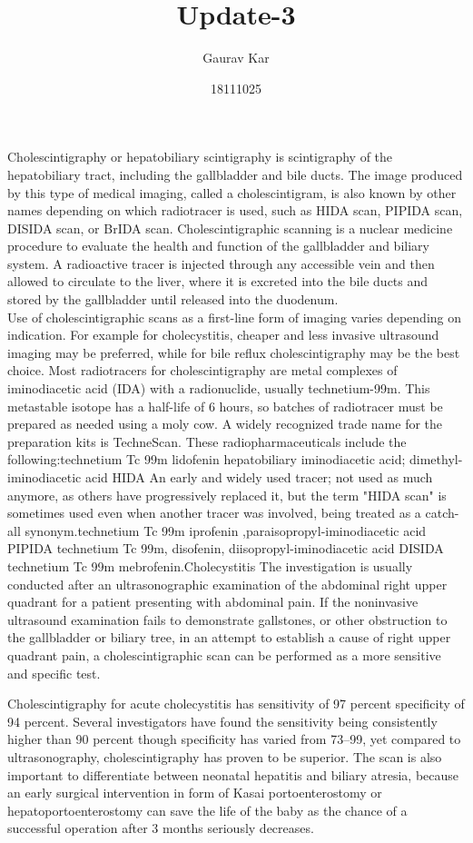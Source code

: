 \documentclass{article}
\title{Update-3}
\author{Gaurav Kar}
\date{18111025}
\begin{document}
 

\maketitle


Cholescintigraphy or hepatobiliary scintigraphy is scintigraphy of the hepatobiliary tract, including the gallbladder and bile ducts. The image produced by this type of medical imaging, called a cholescintigram, is also known by other names depending on which radiotracer is used, such as HIDA scan, PIPIDA scan, DISIDA scan, or BrIDA scan. Cholescintigraphic scanning is a nuclear medicine procedure to evaluate the health and function of the gallbladder and biliary system. A radioactive tracer is injected through any accessible vein and then allowed to circulate to the liver, where it is excreted into the bile ducts and stored by the gallbladder until released into the duodenum.\\Use of cholescintigraphic scans as a first-line form of imaging varies depending on indication. For example for cholecystitis, cheaper and less invasive ultrasound imaging may be preferred, while for bile reflux cholescintigraphy may be the 
best choice. Most radiotracers for cholescintigraphy are metal complexes of iminodiacetic acid (IDA) with a radionuclide, usually technetium-99m. This metastable isotope has a half-life of 6 hours, so batches of radiotracer must be prepared as needed using a moly cow. A widely recognized trade name for the preparation kits is TechneScan. These radiopharmaceuticals include the following:technetium Tc 99m lidofenin	hepatobiliary iminodiacetic acid; dimethyl-iminodiacetic acid	HIDA	An early and widely used tracer; not used as much anymore, as others have progressively replaced it, but the term "HIDA scan" is sometimes used even when another tracer was involved, being treated as a catch-all synonym.technetium Tc 99m iprofenin ,paraisopropyl-iminodiacetic acid	PIPIDA	
technetium Tc 99m, disofenin, diisopropyl-iminodiacetic acid	DISIDA	
technetium Tc 99m mebrofenin.Cholecystitis
The investigation is usually conducted after an ultrasonographic examination of the abdominal right upper quadrant for a patient presenting with abdominal pain. If the noninvasive ultrasound examination fails to demonstrate gallstones, or other obstruction to the gallbladder or biliary tree, in an attempt to establish a cause of right upper quadrant pain, a cholescintigraphic scan can be performed as a more sensitive and specific test.

Cholescintigraphy for acute cholecystitis has sensitivity of 97 percent specificity of 94 percent. Several investigators have found the sensitivity being consistently higher than 90 percent though specificity has varied from 73–99, yet compared to ultrasonography, cholescintigraphy has proven to be superior. The scan is also important to differentiate between neonatal hepatitis and biliary atresia, because an early surgical intervention in form of Kasai portoenterostomy or hepatoportoenterostomy can save the life of the baby as the chance of a successful operation after 3 months seriously decreases.
\end{document}
